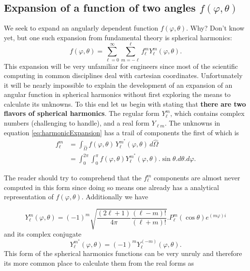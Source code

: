 \documentclass[11pt,letterpaper,titlepage]{article}
\numberwithin{equation}{section}
\begin{document}
\subsection{Expansion of a function of two angles $f(\varphi,\theta)$}
We seek to expand an angularly dependent function $f(\varphi,\theta)$. Why? Don't know yet, but one such expansion from fundamental theory is spherical harmonics:
\begin{equation} \label{eq:harmonicExpansion}
f(\varphi,\theta) = \sum_{\ell=0}^{\infty}\sum_{m=-\ell}^{\ell}   f_{\ell }^m Y_{\ell }^m(\varphi,\theta  ).
\end{equation}
\newline
This expansion will be very unfamiliar for engineers since most of the scientific computing in common disciplines deal with cartesian coordinates. Unfortunately it will be nearly impossible to explain the development of an expansion of an angular function in spherical harmonics without first exploring the means to calculate its unknowns. To this end let us begin with stating that \textbf{there are two flavors of spherical harmonics}. The regular form $Y_{\ell}^m$, which contains complex numbers (challenging to handle), and a real form $Y_{\ell m}$.
The unknowns in equation \ref{eq:harmonicExpansion} has a trail of components the first of which is
\begin{equation*}
\begin{aligned}
f_{\ell }^m
&=\int _{\hat{\Omega} }f(\varphi,\theta )\,Y_{\ell }^{m^*}(\varphi,\theta)\,d\hat{\Omega} \\
&=\int _{0}^{2\pi }\int _{0}^{\pi } f(\varphi,\theta )Y_{\ell }^{m^*}(\varphi,\theta ) .\sin \theta .d\theta .d\varphi .
\end{aligned}
\end{equation*}

The reader should try to comprehend that the $f_{\ell}^m$ components are almost never computed in this form since doing so means one already has a analytical representation of $f(\varphi,\theta)$. Additionally we have

\begin{equation}
Y_{\ell}^m (\varphi,\theta)= 
(-1)^m \sqrt{
\frac{(2\ell+1)}{4\pi}
\frac{(\ell-m)!}{(\ell+m)!}
}
.P_{\ell}^m (\cos \theta)e^{ (m \varphi)i}
\end{equation}
and its complex conjugate
$$Y_{\ell }^{m^*}(\varphi,\theta) = (-1)^mY_{\ell }^{(-m)}(\varphi,\theta).$$
This form of the spherical harmonics functions can be very unruly and therefore its more common place to calculate them from the real forms as
\end{document}
